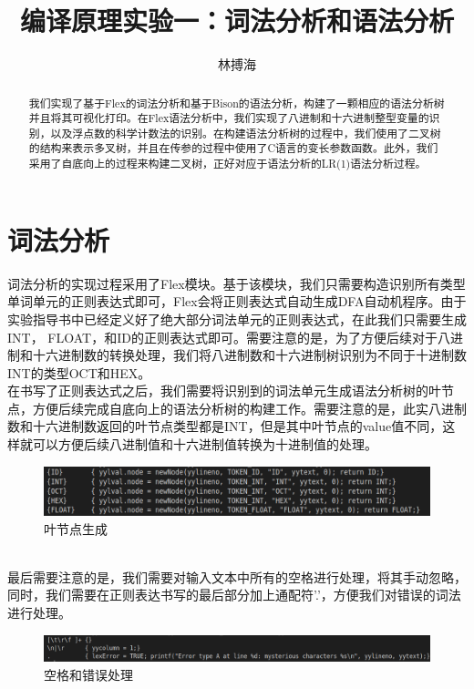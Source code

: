 \documentclass[lang=cn,11pt,a4paper,cite=authoryear]{elegantpaper}
\title{编译原理实验一：词法分析和语法分析}
\author{林搏海}
\institute{{哈尔滨工业大学} {物联网工程}}
\date{\zhtoday}
\begin{document}
\maketitle

\begin{abstract}
\hspace*{0.7cm}我们实现了基于Flex的词法分析和基于Bison的语法分析，构建了一颗相应的语法分析树并且将其可视化打印。在Flex语法分析中，我们实现了八进制和十六进制整型变量的识别，以及浮点数的科学计数法的识别。在构建语法分析树的过程中，我们使用了二叉树的结构来表示多叉树，并且在传参的过程中使用了C语言的变长参数函数。此外，我们采用了自底向上的过程来构建二叉树，正好对应于语法分析的LR(1)语法分析过程。
\end{abstract}



\section{词法分析}

词法分析的实现过程采用了Flex模块。基于该模块，我们只需要构造识别所有类型单词单元的正则表达式即可，Flex会将正则表达式自动生成DFA自动机程序。由于实验指导书中已经定义好了绝大部分词法单元的正则表达式，在此我们只需要生成INT， FLOAT，和ID的正则表达式即可。需要注意的是，为了方便后续对于八进制和十六进制数的转换处理，我们将八进制数和十六进制树识别为不同于十进制数INT的类型OCT和HEX。
\\ \hspace*{0.7cm} 在书写了正则表达式之后，我们需要将识别到的词法单元生成语法分析树的叶节点，方便后续完成自底向上的语法分析树的构建工作。需要注意的是，此实八进制数和十六进制数返回的叶节点类型都是INT，但是其中叶节点的value值不同，这样就可以方便后续八进制值和十六进制值转换为十进制值的处理。
\begin{figure}[h]
	\centering
	\includegraphics[width=\textwidth]{pics//1_2.png}
	\caption{叶节点生成}
\end{figure}
\\ \hspace*{0.7cm} 最后需要注意的是，我们需要对输入文本中所有的空格进行处理，将其手动忽略，同时，我们需要在正则表达书写的最后部分加上通配符'.'，方便我们对错误的词法进行处理。
\begin{figure}[h]
	\centering
	\includegraphics[width=\textwidth]{pics//1_3.png}
	\caption{空格和错误处理}
\end{figure}
\end{document}
